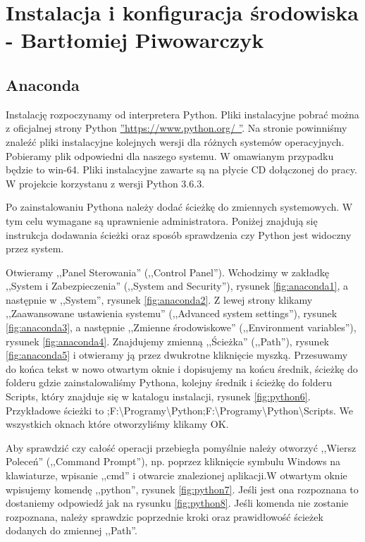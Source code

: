 \section{Instalacja i konfiguracja środowiska - Bartłomiej Piwowarczyk}
\label{sec:instalacja}

\subsection{Anaconda}
\label{sec:anaconda}

Instalację rozpoczynamy od interpretera Python. Pliki instalacyjne pobrać można z oficjalnej strony Python \hyperref[python]{''https://www.python.org/ ''}. Na stronie powinniśmy znaleźć pliki instalacyjne kolejnych wersji dla różnych systemów operacyjnych. Pobieramy plik odpowiedni dla naszego systemu. W omawianym przypadku będzie to win-64. Pliki instalacyjne zawarte są na płycie CD dołączonej do pracy. W projekcie korzystanu z wersji Python 3.6.3.

Po zainstalowaniu Pythona należy dodać ścieżkę do zmiennych systemowych. W tym celu wymagane są uprawnienie administratora. Poniżej znajdują się instrukcja dodawania ścieżki oraz sposób sprawdzenia czy Python jest widoczny przez system.

Otwieramy ,,Panel Sterowania'' (,,Control Panel''). Wchodzimy w zakładkę ,,System i Zabezpieczenia'' (,,System and Security''), rysunek \ref{fig:anaconda1}, a następnie w ,,System'', rysunek \ref{fig:anaconda2}. Z lewej strony klikamy ,,Zaawansowane ustawienia systemu'' (,,Advanced system settings''), rysunek \ref{fig:anaconda3}, a następnie
,,Zmienne środowiskowe'' (,,Environment variables''), rysunek \ref{fig:anaconda4}. Znajdujemy zmienną ,,Ścieżka'' (,,Path''), rysunek \ref{fig:anaconda5} i otwieramy ją przez dwukrotne kliknięcie myszką. Przesuwamy do końca tekst w nowo otwartym oknie i dopisujemy na końcu średnik, ścieżkę do folderu gdzie zainstalowaliśmy Pythona, kolejny średnik i ścieżkę do folderu Scripts, który znajduje się w katalogu instalacji, rysunek \ref{fig:python6}. Przykładowe ścieżki to ;F:\textbackslash Programy\textbackslash Python;F:\textbackslash Programy\textbackslash Python\textbackslash Scripts. We wszystkich oknach które otworzyliśmy klikamy OK.

Aby sprawdzić czy całość operacji przebiegła pomyślnie należy otworzyć ,,Wiersz Poleceń'' (,,Command Prompt''), np. poprzez kliknięcie symbulu Windows na klawiaturze, wpisanie ,,cmd'' i otwarcie znalezionej aplikacji.W otwartym oknie wpisujemy komendę ,,python'', rysunek \ref{fig:python7}.  Jeśli jest ona rozpoznana to dostaniemy odpowiedź jak na rysunku \ref{fig:python8}. Jeśli komenda nie zostanie rozpoznana, należy sprawdzic poprzednie kroki oraz prawidłowość ścieżek dodanych do zmiennej ,,Path''.

